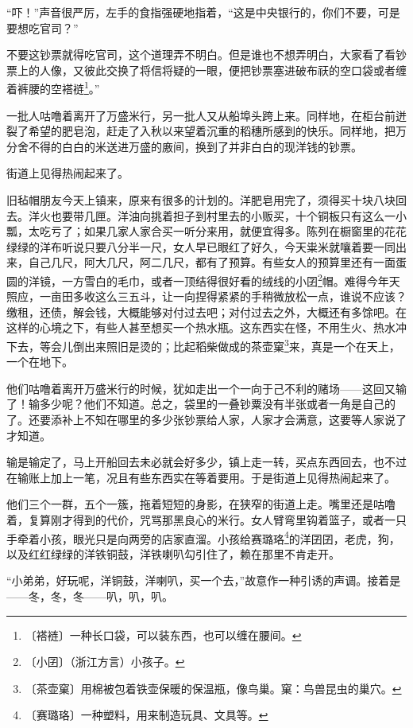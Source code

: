 \documentclass[12pt,UTF-8,openany]{ctexbook}
\begin{document}
\begin{normalsize}
    “吓！”声音很严厉，左手的食指强硬地指着，“这是中央银行的，你们不要，可是要想吃官司？”
    
    不要这钞票就得吃官司，这个道理弄不明白。但是谁也不想弄明白，大家看了看钞票上的人像，又彼此交换了将信将疑的一眼，便把钞票塞进破布祆的空口袋或者缠着裤腰的空褡裢\footnote{〔褡裢〕一种长口袋，可以装东西，也可以缠在腰间。}。”
    
    一批人咕噜着离开了万盛米行，另一批人又从船埠头跨上来。同样地，在柜台前迸裂了希望的肥皂泡，赶走了入秋以来望着沉重的稻穗所感到的快乐。同样地，把万分舍不得的白白的米送进万盛的廒间，换到了并非白白的现洋钱的钞票。
    
    街道上见得热闹起来了。
    
    旧毡帽朋友今天上镇来，原来有很多的计划的。洋肥皂用完了，须得买十块八块回去。洋火也要带几匣。洋油向挑着担子到村里去的小贩买，十个铜板只有这么一小瓢，太吃亏了；如果几家人家合买一听分来用，就便宜得多。陈列在橱窗里的花花绿绿的洋布听说只要八分半一尺，女人早已眼红了好久，今天粜米就嚷着要一同出来，自己几尺，阿大几尺，阿二几尺，都有了预算。有些女人的预算里还有一面蛋圆的洋镜，一方雪白的毛巾，或者一顶结得很好看的绒线的小囝\footnote{〔小囝〕（浙江方言）小孩子。}帽。难得今年天照应，一亩田多收这么三五斗，让一向捏得紧紧的手稍微放松一点，谁说不应该？缴租，还债，解会钱，大概能够对付过去吧；对付过去之外，大概还有多馀吧。在这样的心境之下，有些人甚至想买一个热水瓶。这东西实在怪，不用生火、热水冲下去，等会儿倒出来照旧是烫的；比起稻柴做成的茶壶窠\footnote{〔茶壶窠〕用棉被包着铁壶保暖的保温瓶，像鸟巢。窠：鸟兽昆虫的巢穴。}来，真是一个在天上，一个在地下。
    
    他们咕噜着离开万盛米行的时候，犹如走出一个一向于己不利的赌场——这回又输了！输多少呢？他们不知道。总之，袋里的一叠钞粟没有半张或者一角是自己的了。还要添补上不知在哪里的多少张钞票给人家，人家才会满意，这要等人家说了才知道。
    
    输是输定了，马上开船回去未必就会好多少，镇上走一转，买点东西回去，也不过在输账上加上一笔，况且有些东西实在等着要用。于是街道上见得热闹起来了。
    
    他们三个一群，五个一簇，拖着短短的身影，在狭窄的街道上走。嘴里还是咕噜着，复算刚才得到的代价，咒骂那黑良心的米行。女人臂弯里钩着篮子，或者一只手牵着小孩，眼光只是向两旁的店家直溜。小孩给赛璐珞\footnote{〔赛璐珞〕一种塑料，用来制造玩具、文具等。}的洋囝囝，老虎，狗，以及红红绿绿的洋铁铜鼓，洋铁喇叭勾引住了，赖在那里不肯走开。
    
    “小弟弟，好玩呢，洋铜鼓，洋喇叭，买一个去，”故意作一种引诱的声调。接着是——冬，冬，冬——叭，叭，叭。
    

\end{normalsize}
\end{document}
